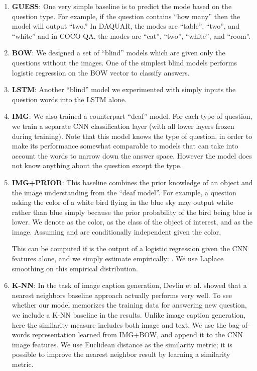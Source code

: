 \documentclass{article} \usepackage{nips15submit_e,times}
\renewcommand{\#}[1]{\textbf{#1}}
\begin{document}
\begin{enumerate}[leftmargin=*]
\item \#{GUESS}: One very simple baseline is to predict the mode based on the
question type. For example, if the question contains ``how many'' then the
model will output ``two.'' In DAQUAR, the modes are ``table'', ``two'', and
``white'' and in COCO-QA, the modes are ``cat'', ``two'', ``white'', and
``room''.

\item \#{BOW}: We designed a set of ``blind'' models which are given only the
questions without the images. One of the simplest blind models performs
logistic regression on the BOW vector to classify answers.

\item \#{LSTM}: Another ``blind'' model we experimented with simply inputs the
question words into the LSTM alone.

\item \#{IMG}: We also trained a counterpart ``deaf'' model. For each type of
question, we train a separate CNN classification layer (with all lower layers
frozen during training). Note that this model knows the type of question, in
order to make its performance somewhat comparable to models that can take
into account the words to narrow down the answer space. However the model does
not know anything about the question except the type.

\item \#{IMG+PRIOR}: This baseline combines the prior knowledge of an object
and the image understanding from the ``deaf model''. For example, a question
asking the color of a white bird flying in the blue sky may output white rather
than blue simply because the prior probability of the bird being blue is lower.
We denote  as the color,  as the class of the object of interest, and 
as the image. Assuming  and  are conditionally independent given the
color,


This can be computed if  is the output of a logistic regression given
the CNN features alone, and we simply estimate  empirically:
. We use Laplace smoothing on
this empirical distribution.

\item \#{K-NN}: In the task of image caption generation, Devlin et al.
\cite{devlin15} showed that a nearest neighbors baseline approach actually
performs very well. To see whether our model memorizes the training data for
answering new question, we include a K-NN baseline in the results. Unlike
image caption generation, here the similarity measure includes both image
and text.  We use the bag-of-words representation learned from IMG+BOW, and
append it to the CNN image features.  We use Euclidean distance as the
similarity metric; it is possible to improve the nearest neighbor result by 
learning a similarity metric.
\end{enumerate}
\end{document}
